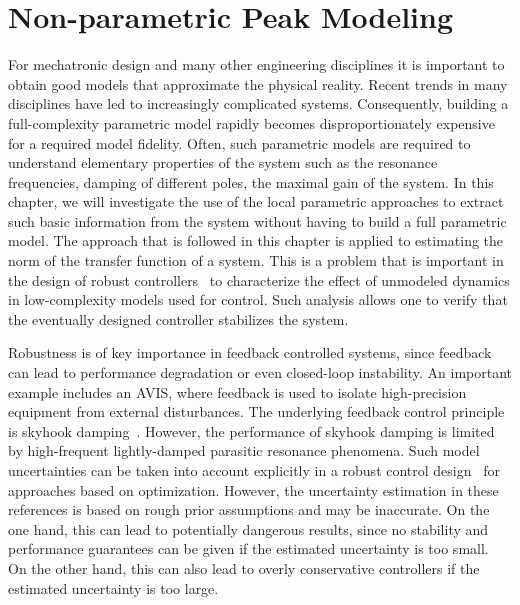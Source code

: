 \chapter{Non-parametric Peak Modeling}
\label{sec:hinf}
\def\thisDir{ch04-lrmhinf}
\glsresetall

\newcommand{\wnValue}{\ensuremath{0.95 \unit{rad/s}}}
\newcommand{\dampingValue}{\ensuremath{0.025}}
\newcommand{\TsValue}{\ensuremath{1 \unit{s}}}


For mechatronic design and many other engineering disciplines it is important to obtain good  models that approximate the physical reality.
Recent trends in many disciplines have led to increasingly complicated systems.
Consequently, building a full-complexity parametric model rapidly becomes disproportionately expensive for a required model fidelity.
Often, such parametric models are required to understand elementary properties of the system such as the resonance frequencies, damping of different poles, the maximal gain of the system.
In this chapter, we will investigate the use of the local parametric approaches to extract such basic information from the system without having to build a full parametric model.
The approach that is followed in this chapter is applied to estimating the \Hinf{} norm of the transfer function of a system.
This is a problem that is important in the design of robust controllers~\citep{Oomen2016} to characterize the effect of unmodeled dynamics in low-complexity models used for control.
Such analysis allows one to verify that the eventually designed controller stabilizes the system.

Robustness is of key importance in feedback controlled systems, since feedback can lead to performance degradation or even closed-loop instability.
An important example includes an \gls{AVIS}, where feedback is used to isolate high-precision equipment from external disturbances. 
The underlying feedback control principle is skyhook damping~\citep{Karnopp1995,Collette2011}. 
However, the performance of skyhook damping is limited by high-frequent lightly-damped parasitic resonance phenomena.
Such model uncertainties can be taken into account explicitly in a robust control design~\citep{Zhang2005HybridAvis} for approaches based on \Hinf{} optimization.
However, the uncertainty estimation in these references is based on rough prior assumptions and may be inaccurate. 
On the one hand, this can lead to potentially dangerous results, since no stability and performance guarantees can be given if the estimated uncertainty is too small. 
On the other hand, this can also lead to overly conservative controllers if the estimated uncertainty is too large.

